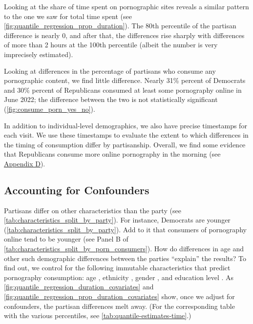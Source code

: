 \documentclass[12pt,twoside]{article}
\begin{document}
Looking at the share of time spent on pornographic sites reveals a similar pattern to the one we saw for total time spent (see \cref{fig:quantile_regression_prop_duration}). The 80th percentile of the partisan difference is nearly 0, and after that, the differences rise sharply with differences of more than 2 hours at the 100th percentile (albeit the number is very imprecisely estimated).

Looking at differences in the percentage of partisans who consume any pornographic content, we find little difference. Nearly 31\% percent of Democrats and 30\% percent of Republicans consumed at least some pornography online in June 2022; the difference between the two is not statistically significant (\cref{fig:consume_porn_yes_no}). 

In addition to individual-level demographics, we also have precise timestamps for each visit. We use these timestamps to evaluate the extent to which differences in the timing of consumption differ by partisanship. Overall, we find some evidence that Republicans consume more online pornography in the morning (see \hyperref[sm:smD]{Appendix D}).

\subsection{Accounting for Confounders}

Partisans differ on other characteristics than the party (see \cref{tab:characteristics_split_by_party}). For instance, Democrats are younger (\cref{tab:characteristics_split_by_party}). Add to it that consumers of pornography online tend to be younger (see Panel B of \cref{tab:characteristics_split_by_porn_consumers}). How do differences in age and other such demographic differences between the parties ``explain'' the results? To find out, we control for the following immutable characteristics that predict pornography consumption: age \citep{Wright2013-an, Woodrum1992-vk}, ethnicity \citep{Wright2013-an}, gender \citep{Woodrum1992-vk}, and education level \citep{Woodrum1992-vk}. As \cref{fig:quantile_regression_duration_covariates} and \cref{fig:quantile_regression_prop_duration_covariates} show, once we adjust for confounders, the partisan differences melt away. (For the corresponding table with the various percentiles, see \cref{tab:quantile-estimates-time}.)
\end{document}
